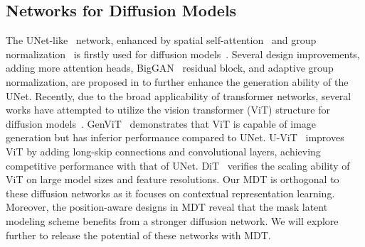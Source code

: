 \documentclass[final]{cvpr}
\begin{document}
\subsection{Networks for Diffusion Models}
The UNet-like~\cite{ronneberger2015u} network, enhanced by 
spatial self-attention~\cite{salimans2017pixelcnn++,van2016conditional}
and group normalization~\cite{wu2018group}
is firstly used for diffusion models~\cite{ho2020denoising}.
Several design improvements, \eg adding more attention heads,
BigGAN~\cite{brock2018large} residual block, and adaptive group normalization, 
are proposed in\cite{dhariwal2021diffusion} to further enhance the generation ability of the UNet.
Recently, due to the broad applicability of transformer networks,
several works have attempted to utilize the vision transformer (ViT) structure for 
diffusion models~\cite{yang2022your,bao2022all,peebles2022scalable}.
GenViT~\cite{yang2022your} demonstrates that ViT is capable of image generation but has inferior performance
compared to UNet.
U-ViT~\cite{bao2022all} improves ViT by adding long-skip connections and convolutional layers,
achieving competitive performance with that of UNet.
DiT~\cite{peebles2022scalable} verifies the scaling ability of ViT on large model sizes and feature
resolutions.
Our MDT is orthogonal to these diffusion networks as it focuses on
contextual representation learning.
Moreover, the position-aware designs in MDT reveal that
the mask latent modeling scheme benefits from a stronger diffusion network.
We will explore further to release the potential of these networks with MDT. 
\end{document}
